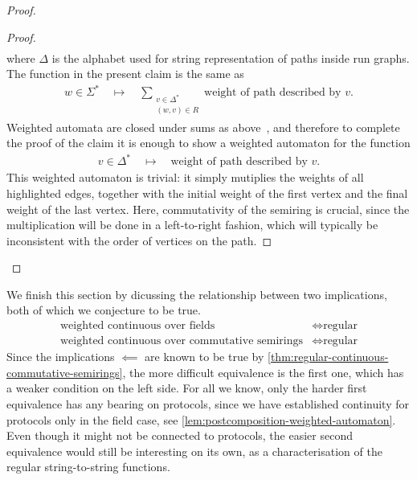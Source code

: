 \begin{proof}
\begin{proof}
\begin{align*}
    \end{align*}
    where $\Delta$ is the alphabet used for string representation of paths inside run graphs. The function in the present claim is the same as 
    \begin{align*}
    w \in \Sigma^* 
    \quad \mapsto \quad 
    \sum_{\substack{v \in \Delta^* \\ (w,v) \in R}} \text{weight of path described by $v$}.
    \end{align*} 
    Weighted automata are closed under sums as above~\cite[Lemma 8.12]{bojanczyk_automata_2025}, and therefore to complete the proof of the claim it is enough to show a weighted automaton for the function
    \begin{align*}
    v \in \Delta^* 
    \quad \mapsto \quad 
    \text{weight of path described by $v$}.
    \end{align*}
    This weighted automaton is trivial: it simply mutiplies the weights of all highlighted edges, together with the initial weight of the first vertex and the final weight of the last vertex. Here, commutativity of the semiring is crucial, since the multiplication will be done in a left-to-right fashion, which will typically be inconsistent with the order of vertices on the path. 
\end{proof}

\end{proof}

We finish this section by dicussing the relationship between two implications, both of which we conjecture to be true.
\begin{align}
\text{weighted continuous over fields}
& \iff
\text{regular}
\label{eq:weighted-continuous-fields-again}\\
    \text{weighted continuous over commutative semirings}
& \iff
\text{regular}
\label{eq:weighted-continuous-commutative-semirings-again}
\end{align}
Since the implications $\impliedby$ are known to be true by \cref{thm:regular-continuous-commutative-semirings}, the more difficult equivalence is the first one, which has a weaker condition on the left side. 
For all we know, only the harder  first equivalence has any bearing on protocols, since we have established continuity for protocols only in the field case, see \cref{lem:postcomposition-weighted-automaton}. Even though it might not be connected to protocols, the  easier second equivalence would still be interesting on its own, as a characterisation of the regular string-to-string functions.